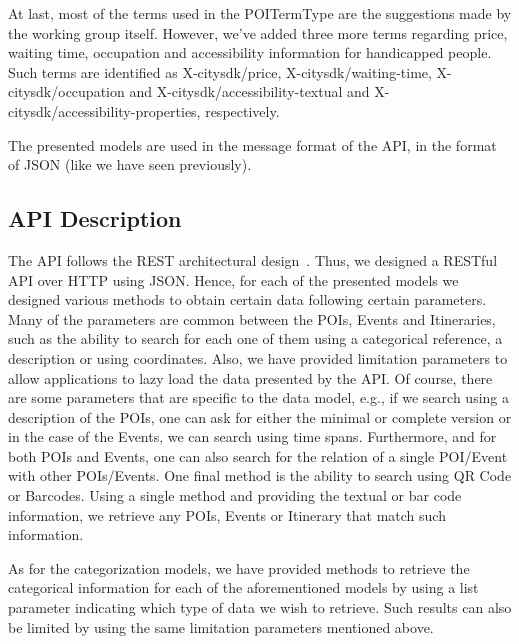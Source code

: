 \documentclass[times]{ettauth}
\begin{document}
At last, most of the terms used in the POITermType are the suggestions made by the working group itself. However, we've added three more terms regarding price, waiting time, occupation and accessibility information for handicapped people. Such terms are identified as X-citysdk/price, X-citysdk/waiting-time, X-citysdk/occupation and X-citysdk/accessibility-textual and X-citysdk/accessibility-properties, respectively.

The presented models are used in the message format of the API, in the format of \ac{JSON} (like we have seen previously).

\subsection{API Description}
\label{s:api-description}
The API follows the \ac{REST} architectural design~\cite{Fielding:2002:PDM:514183.514185}. Thus, we designed a RESTful API over HTTP using JSON. Hence, for each of the presented models we designed various methods to obtain certain data following certain parameters. Many of the parameters are common between the \acp{POI}, Events and Itineraries, such as the ability to search for each one of them using a categorical reference, a description or using coordinates. Also, we have provided limitation parameters to allow applications to lazy load the data presented by the API. Of course, there are some parameters that are specific to the data model, e.g., if we search using a description of the \acp{POI}, one can ask for either the minimal or complete version or in the case of the Events, we can search using time spans. Furthermore, and for both \acp{POI} and Events, one can also search for the relation of a single \ac{POI}/Event with other \acp{POI}/Events. One final method is the ability to search using QR Code or Barcodes. Using a single method and providing the textual or bar code information, we retrieve any POIs, Events or Itinerary that match such information.

As for the categorization models, we have provided methods to retrieve the categorical information for each of the aforementioned models by using a list parameter indicating which type of data we wish to retrieve. Such results can also be limited by using the same limitation parameters mentioned above.
\end{document}
